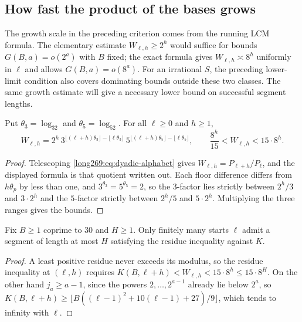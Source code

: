 \subsection{How fast the product of the bases grows}

The growth scale in the preceding criterion comes from the running
LCM formula. The elementary estimate $W_{\ell,h}\ge2^h$ would suffice
for bounds $G(B,a)=o(2^a)$ with $B$ fixed; the exact formula gives
$W_{\ell,h}\asymp8^h$ uniformly in $\ell$ and allows $G(B,a)=o(8^a)$.
For an irrational $S$, the preceding lower-limit condition also covers
dominating bounds outside these two classes. The same growth estimate
will give a necessary lower bound on successful segment lengths.

\begin{proposition}\label{long269:res:window-growth}
Put $\theta_3=\log_32$ and $\theta_5=\log_52$.  For all $\ell\ge0$ and
$h\ge1$,
\[
 W_{\ell,h}=2^{h}\,
 3^{\lfloor(\ell+h)\theta_3\rfloor-\lfloor\ell\theta_3\rfloor}\,
 5^{\lfloor(\ell+h)\theta_5\rfloor-\lfloor\ell\theta_5\rfloor},
 \qquad
 \frac{8^{h}}{15}<W_{\ell,h}<15\cdot8^{h} .
\]
\end{proposition}

\begin{proof}
Telescoping \eqref{long269:eq:dyadic-alphabet} gives
$W_{\ell,h}=P_{\ell+h}/P_\ell$, and the displayed formula is that
quotient written out.  Each floor difference differs from $h\theta_p$ by less
than one, and $3^{\theta_3}=5^{\theta_5}=2$, so the $3$-factor lies strictly
between $2^{h}/3$ and $3\cdot2^{h}$ and the $5$-factor strictly between
$2^{h}/5$ and $5\cdot2^{h}$.  Multiplying the three ranges gives the bounds.
\end{proof}

\begin{corollary}\label{long269:res:no-bounded-length}
Fix $B\ge1$ coprime to $30$ and $H\ge1$.  Only finitely many starts $\ell$
admit a segment of length at most $H$ satisfying the residue inequality against $K$.
\end{corollary}

\begin{proof}
A least positive residue never exceeds its modulus, so the residue inequality at $(\ell,h)$
requires $K(B,\ell+h)<W_{\ell,h}<15\cdot8^{h}\le15\cdot8^{H}$.  On the other
hand $j_a\ge a-1$, since the powers $2,\ldots,2^{a-1}$ already lie below
$2^{a}$, so $K(B,\ell+h)\ge\lfloor B((\ell-1)^{2}+10(\ell-1)+27)/9\rfloor$,
which tends to infinity with $\ell$.
\end{proof}

